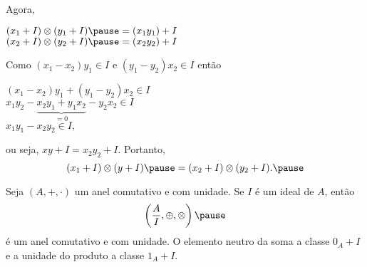 \documentclass{beamer}
\begin{document}
    \begin{frame}
        Agora,\pause
        \begin{center}
            $(x_1 + I) \otimes (y_1 + I) \pause = (x_1y_1) + I$\pause\\
            $(x_2 + I) \otimes (y_2 + I) \pause = (x_2y_2) + I$\pause
        \end{center}

        Como $(x_1 - x_2)y_1 \in I$ \pause e $(y_1 - y_2)x_2 \in I$ \pause ent\~ao\pause
        \begin{center}
            $(x_1 - x_2)y_1 + (y_1 - y_2)x_2 \in I$\pause\\
            $x_1y_2-\underbrace{x_2y_1 + y_1x_2}_{= 0} - y_2x_2 \in I$\pause\\
            $x_1y_1 - x_2y_2\in I,$\pause
        \end{center}
        ou seja, \pause $xy + I = x_2y_2 + I$. \pause Portanto,\pause
        \[
            (x_1 + I) \otimes (y + I) \pause = (x_2 + I) \otimes (y_2 + I).\pause
        \]
    \end{frame}

    \begin{frame}
        \begin{teorema}
            Seja $(A, +, \cdot)$ um anel comutativo \pause e com unidade. \pause Se $I$ {\'e} um ideal de $A$, \pause ent\~ao
            \[
                \left(\dfrac{A}{I}, \oplus, \otimes\right)\pause
            \]
            {\'e} um anel comutativo \pause e com unidade. \pause O elemento neutro da soma  a classe $0_{A} + I$ \pause e a unidade do produto  a classe $1_{A} + I$.\pause
        \end{teorema}
    \end{frame}
\end{document}
